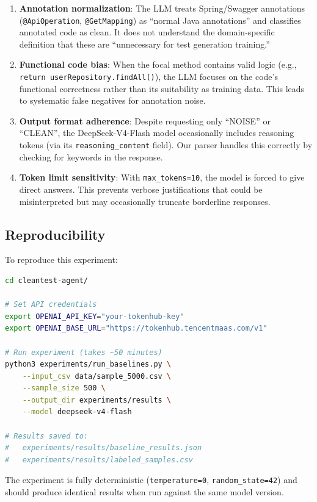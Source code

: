 \documentclass[acmlarge,nonacm,screen]{acmart}
\begin{document}
\begin{enumerate}
    \item \textbf{Annotation normalization}: The LLM treats Spring/Swagger annotations (\texttt{@ApiOperation}, \texttt{@GetMapping}) as ``normal Java annotations'' and classifies annotated code as clean. It does not understand the domain-specific definition that these are ``unnecessary for test generation training.''

    \item \textbf{Functional code bias}: When the focal method contains valid logic (e.g., \texttt{return userRepository.findAll()}), the LLM focuses on the code's functional correctness rather than its suitability as training data. This leads to systematic false negatives for annotation noise.

    \item \textbf{Output format adherence}: Despite requesting only ``NOISE'' or ``CLEAN'', the DeepSeek-V4-Flash model occasionally includes reasoning tokens (via its \texttt{reasoning\_content} field). Our parser handles this correctly by checking for keywords in the response.

    \item \textbf{Token limit sensitivity}: With \texttt{max\_tokens=10}, the model is forced to give direct answers. This prevents verbose justifications that could be misinterpreted but may occasionally truncate borderline responses.
\end{enumerate}

\subsection{Reproducibility}

To reproduce this experiment:

\begin{lstlisting}[language=bash,caption={Reproducing the LLM experiment}]
cd cleantest-agent/

# Set API credentials
export OPENAI_API_KEY="your-tokenhub-key"
export OPENAI_BASE_URL="https://tokenhub.tencentmaas.com/v1"

# Run experiment (takes ~50 minutes)
python3 experiments/run_baselines.py \
    --input_csv data/sample_5000.csv \
    --sample_size 500 \
    --output_dir experiments/results \
    --model deepseek-v4-flash

# Results saved to:
#   experiments/results/baseline_results.json
#   experiments/results/labeled_samples.csv
\end{lstlisting}

The experiment is fully deterministic (\texttt{temperature=0}, \texttt{random\_state=42}) and should produce identical results when run against the same model version.
\end{document}
